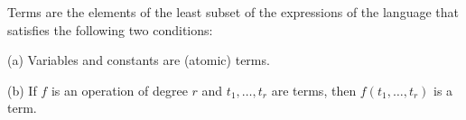 Terms are the elements of the least subset of the expressions of the language that satisfies the following two conditions:

(a) Variables and constants are (atomic) terms.

(b) If $f$ is an operation of degree $r$ and $t_1, \ldots, t_r$ are terms, then $f(t_1, \ldots, t_r)$ is a term.
